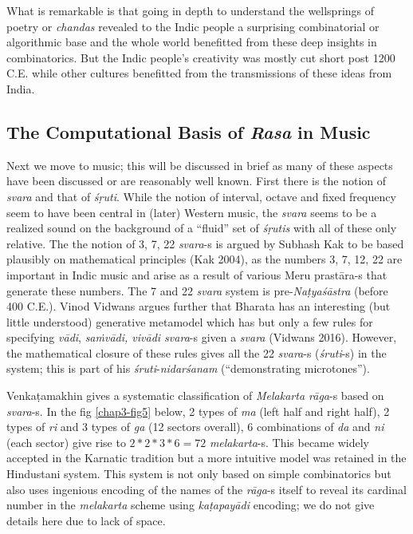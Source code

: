 What is remarkable is that going in depth to understand the wellsprings of poetry or \textsl{chandas} revealed to the Indic people a surprising combinatorial or algorithmic base and the whole world benefitted from these deep insights in combinatorics. But the Indic people’s creativity was mostly cut short post 1200 C.E. while other cultures benefitted from the transmissions of these ideas from India.

\subsection{The Computational Basis of \textsl{Rasa} in Music}\label{chap3-sec5.2}

Next we move to music; this will be discussed in brief as many of these aspects have been discussed or are reasonably well known. First there is the notion of \textsl{svara} and that of \textsl{śṛuti}. While the notion of interval, octave and fixed frequency seem to have been central in (later) Western music, the \textsl{svara} seems to be a realized sound on the background of a “fluid” set of \textsl{śṛutis} with all of these only relative. The the notion of 3, 7, 22 \textsl{svara}-s is argued by Subhash Kak to be based plausibly on mathematical principles (Kak 2004), as the numbers 3, 7, 12, 22 are important in Indic music and arise as a result of various Meru prastāra-s that generate these numbers. The 7 and 22 \textsl{svara} system is pre-\textsl{Naṭyaśāstra} (before 400 C.E.). Vinod Vidwans argues further that Bharata has an interesting (but little understood) generative metamodel which has but only a few rules for specifying \textsl{vādi}, \textsl{saṁvādi, vivādi svara}-s given a \textsl{svara} (Vidwans 2016). However, the mathematical closure of these rules gives all the 22 \textsl{svara}-s (\textsl{śruti}-s) in the system; this is part of his \textsl{śruti}-\textsl{nidarśanam} (“demonstrating microtones”). 

Venkaṭamakhin gives a systematic classification of \textsl{Melakarta rāga}-s based on \textsl{svara}-s. In the fig \ref{chap3-fig5} below, 2 types of \textsl{ma} (left half and right half), 2 types of \textsl{ri} and 3 types of \textsl{ga} (12 sectors overall), 6 combinations of \textsl{da} and \textsl{ni} (each sector) give rise to $2*2*3*6=72$ \textsl{melakarta}-s. This became widely accepted in the Karnatic tradition but a more intuitive model was retained in the Hindustani system. This system is not only based on simple combinatorics but also uses ingenious encoding of the names of the \textsl{rāga}-s itself to reveal its cardinal number in the \textsl{melakarta} scheme using \textsl{kaṭapayādi} encoding; we do not give details here due to lack of space.


